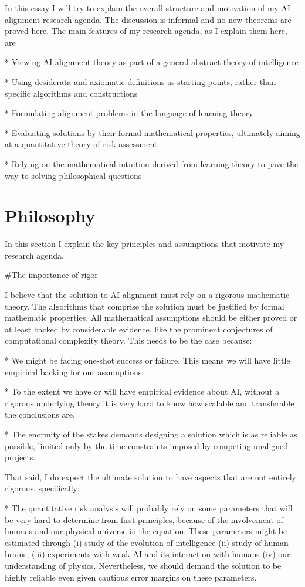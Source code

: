 \documentclass[a4paper]{article}
\begin{document}
In this essay I will try to explain the overall structure and motivation of my AI alignment research agenda. The discussion is informal and no new theorems are proved here. The main features of my research agenda, as I explain them here, are 

* Viewing AI alignment theory as part of a general abstract theory of intelligence

* Using desiderata and axiomatic definitions as starting points, rather than specific algorithms and constructions

* Formulating alignment problems in the language of learning theory

* Evaluating solutions by their formal mathematical properties, ultimately aiming at a quantitative theory of risk assessment

* Relying on the mathematical intuition derived from learning theory to pave the way to solving philosophical questions

\section{Philosophy}

In this section I explain the key principles and assumptions that motivate my research agenda.

\#The importance of rigor

I believe that the solution to AI alignment must rely on a rigorous mathematic theory. The algorithms that comprise the solution must be justified by formal mathematic properties. All mathematical assumptions should be either proved or at least backed by considerable evidence, like the prominent conjectures of computational complexity theory. This needs to be the case because:

* We might be facing one-shot success or failure. This means we will have little empirical backing for our assumptions.

* To the extent we have or will have empirical evidence about AI, without a rigorous underlying theory it is very hard to know how scalable and transferable the conclusions are.

* The enormity of the stakes demands designing a solution which is as reliable as possible, limited only by the time constraints imposed by competing unaligned projects.

That said, I do expect the ultimate solution to have aspects that are not entirely rigorous, specifically:

* The quantitative risk analysis will probably rely on some parameters that will be very hard to determine from first principles, because of the involvement of humans and our physical universe in the equation. These parameters might be estimated through (i) study of the evolution of intelligence (ii) study of human brains, (iii) experiments with weak AI and its interaction with humans (iv) our understanding of physics. Nevertheless, we should demand the solution to be highly reliable even given cautious error margins on these parameters.
\end{document}
